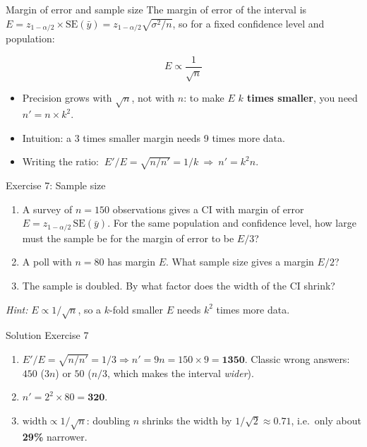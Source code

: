 \documentclass[
  11pt,
  ignorenonframetext,
  aspectratio=169,
]{beamer}
\providecommand{\tightlist}{%
  \setlength{\itemsep}{0pt}\setlength{\parskip}{0pt}}
\newcommand{\se}{\mathrm{SE}}
\begin{document}
\begin{frame}{Margin of error and sample size}
\protect{}\label{margin-of-error-and-sample-size}
The margin of error of the interval is
\(E=z_{1-\alpha/2}\times\se(\bar y)=z_{1-\alpha/2}\sqrt{\sigma^2/n}\), so
for a fixed confidence level and population:

\[E\propto\frac{1}{\sqrt n}\]

\begin{itemize}
\tightlist
\item
  Precision grows with \(\sqrt n\), not with \(n\): to make \(E\)
  \textbf{\(k\) times smaller}, you need \(n'=n\times k^2\).
\item
  Intuition: a 3 times smaller margin needs 9 times more data.
\item
  Writing the ratio: \(\ E'/E=\sqrt{n/n'}=1/k\ \Rightarrow\ n'=k^2 n\).
\end{itemize}
\end{frame}

\begin{frame}{Exercise 7: Sample size}
\protect{}\label{exercise-7-sample-size}
\begin{enumerate}
\tightlist
\item
  A survey of \(n=150\) observations gives a CI with margin of error
  \(E=z_{1-\alpha/2}\,\se(\bar y)\). For the same population and
  confidence level, how large must the sample be for the margin of error
  to be \(E/3\)?
\item
  A poll with \(n=80\) has margin \(E\). What sample size gives a margin
  \(E/2\)?
\item
  The sample is doubled. By what factor does the width of the CI shrink?
\end{enumerate}

\emph{Hint:} \(E\propto1/\sqrt n\), so a \(k\)-fold smaller \(E\) needs
\(k^2\) times more data.
\end{frame}

\begin{frame}{Solution Exercise 7}
\protect{}\label{solution-exercise-7}
\begin{enumerate}
\item
  \(E'/E=\sqrt{n/n'}=1/3\Rightarrow n'=9n=150\times9=\mathbf{1350}\).
  Classic wrong answers: \(450\) (\(3n\)) or \(50\) (\(n/3\), which makes
  the interval \emph{wider}).
\item
  \(n'=2^2\times80=\mathbf{320}\).
\item
  \(\text{width}\propto1/\sqrt n\): doubling \(n\) shrinks the width by
  \(1/\sqrt2\approx0.71\), i.e.~only about \textbf{29\%} narrower.
\end{enumerate}
\end{frame}
\end{document}
